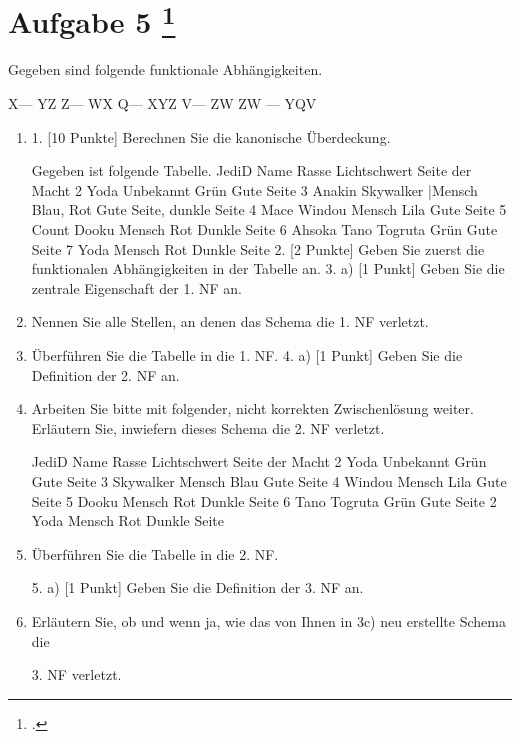 \documentclass{lehramt-informatik-aufgabe}
\begin{document}
\liAufgabenTitel{}
\section{Aufgabe 5
\footcite{examen:66116:2019:09}}

Gegeben sind folgende funktionale Abhängigkeiten.

X— YZ
Z— WX
Q— XYZ
V— ZW
ZW — YQV

\begin{enumerate}

\item 1. [10 Punkte] Berechnen Sie die kanonische Überdeckung.

Gegeben ist folgende Tabelle.
JediD Name Rasse Lichtschwert Seite der Macht
2 Yoda Unbekannt Grün Gute Seite
3 Anakin Skywalker |Mensch Blau, Rot Gute Seite, dunkle Seite
4 Mace Windou Mensch Lila Gute Seite
5 Count Dooku Mensch Rot Dunkle Seite
6 Ahsoka Tano Togruta Grün Gute Seite
7 Yoda Mensch Rot Dunkle Seite
2. [2 Punkte] Geben Sie zuerst die funktionalen Abhängigkeiten in der Tabelle an.
3. a) [1 Punkt] Geben Sie die zentrale Eigenschaft der 1. NF an.

\item [3 Punkte] Nennen Sie alle Stellen, an denen das Schema die 1. NF verletzt.


\item [3 Punkte] Überführen Sie die Tabelle in die 1. NF.
4. a) [1 Punkt] Geben Sie die Definition der 2. NF an.


\item [2 Punkte] Arbeiten Sie bitte mit folgender, nicht korrekten Zwischenlösung weiter.
Erläutern Sie, inwiefern dieses Schema die 2. NF verletzt.

JediD Name Rasse Lichtschwert Seite der Macht
2 Yoda Unbekannt Grün Gute Seite
3 Skywalker Mensch Blau Gute Seite
4 Windou Mensch Lila Gute Seite
5 Dooku Mensch Rot Dunkle Seite
6 Tano Togruta Grün Gute Seite
2 Yoda Mensch Rot Dunkle Seite


\item [3 Punkte] Überführen Sie die Tabelle in die 2. NF.

5. a) [1 Punkt] Geben Sie die Definition der 3. NF an.


\item [1 Punkt] Erläutern Sie, ob und wenn ja, wie das von Ihnen in 3c) neu erstellte Schema die

3. NF verletzt.

\end{enumerate}
\end{document}
